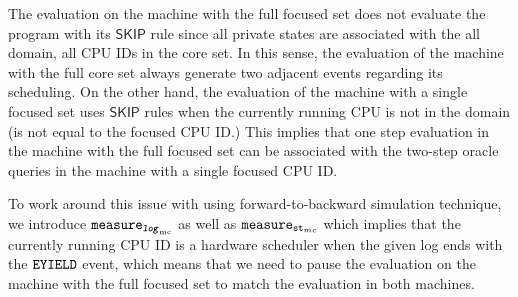 The evaluation on the machine with the full focused set does not evaluate the program with its $\textsf{SKIP}$ rule since all private states are associated with the all domain, all CPU IDs in the core set. 
In this sense, the evaluation of the machine with the full core set always generate two adjacent events regarding its scheduling. 
On the other hand, the evaluation of the machine with a single focused set uses 
$\textsf{SKIP}$ rules when the currently running CPU is not in the domain (is not equal to the focused CPU ID.)
This implies that one step evaluation in the machine with the full focused set 
can be associated with the two-step oracle queries in the machine with a single focused CPU ID.

To work around this issue with using forward-to-backward simulation technique, 
we introduce ${{\mathrm{\texttt{measure}}}_{{{\mathrm{\texttt{\textbf{\textit{log}}}}}_{\mathrm{mc}}}}}$ as well as ${{\mathrm{\texttt{measure}}}_{{\mathrm{\texttt{st}}}_{mc}}}$ which implies that 
the currently running CPU ID is a hardware scheduler when the given log ends with the ${{\mathrm{\texttt{EYIELD}}}}$ event, which means that we need to pause the evaluation on the machine with the full focused set to match the evaluation in both machines.

